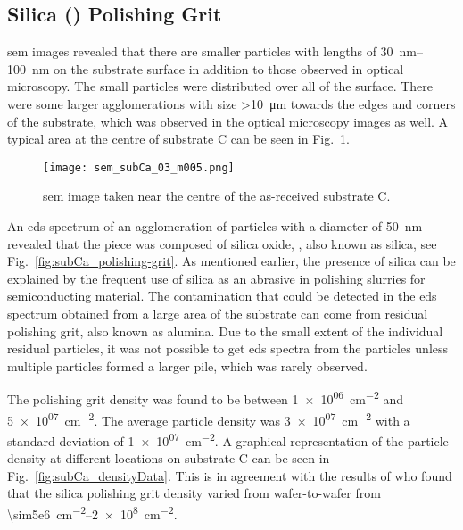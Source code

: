 \subsection{Silica () Polishing Grit}

\Ac{sem} images revealed that there are smaller particles with lengths of \SIrange{30}{100}{\nano\metre} on the substrate surface in addition to those observed in optical microscopy. The small particles were distributed over all of the surface. There were some larger agglomerations with size \SI{>10}{\micro\metre} towards the edges and corners of the substrate, which was observed in the optical microscopy images as well. A typical area at the centre of substrate C can be seen in Fig.~\ref{fig:subCa_sem_area}.

\begin{figure}[htbp]
    \centering
    \texttt{[image: sem\_subCa\_03\_m005.png]}
    \caption[\Ac{sem} image taken near the centre of the as-received substrate C.]{\Ac{sem} image taken near the centre of the as-received substrate C.}
    \label{fig:subCa_sem_area}
\end{figure}

An \ac{eds} spectrum of an agglomeration of particles with a diameter of \SI{50}{\nano\metre} revealed that the piece was composed of silica oxide, , also known as silica, see Fig.~\ref{fig:subCa_polishing-grit}. As mentioned earlier, the presence of silica can be explained by the frequent use of silica as an abrasive in polishing slurries for semiconducting material. The  contamination that could be detected in the \ac{eds} spectrum obtained from a large area of the substrate can come from residual  polishing grit, also known as alumina. Due to the small extent of the individual residual particles, it was not possible to get \ac{eds} spectra from the particles unless multiple particles formed a larger pile, which was rarely observed.

The polishing grit density was found to be between \SI{1e+06}{\centi\metre^{-2}} and \SI{5e+07}{\centi\metre^{-2}}. The average particle density was \SI{3e+07}{\centi\metre^{-2}} with a standard deviation of \SI{1e+07}{\centi\metre^{-2}}. A graphical representation of the particle density at different locations on substrate C can be seen in Fig.~\ref{fig:subCa_densityData}. This is in agreement with the results of \citet{benson2015as-received} who found that the silica polishing grit density varied from wafer-to-wafer from \SIrange{\sim5e6}{2e8}{\centi\metre^{-2}}.


